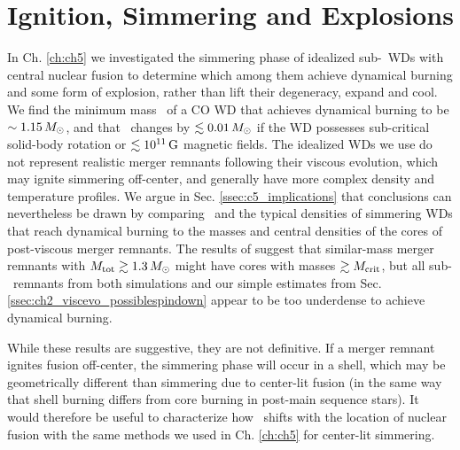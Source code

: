 
\section{Ignition, Simmering and Explosions}


In Ch. \ref{ch:ch5} we investigated the simmering phase of idealized sub-\Mch\ WDs with central nuclear fusion to determine which among them achieve dynamical burning and some form of explosion, rather than lift their degeneracy, expand and cool.  We find the minimum mass \Mcrit\ of a CO WD that achieves dynamical burning to be $\sim1.15\,\Msun$, and that \Mcrit\ changes by $\lesssim0.01\,\Msun$ if the WD possesses sub-critical solid-body rotation or $\lesssim 10^{11}\,\mathrm{G}$ magnetic fields.  The idealized WDs we use do not represent realistic merger remnants following their viscous evolution, which may ignite simmering off-center, and generally have more complex density and temperature profiles.  We argue in Sec. \ref{ssec:c5_implications} that conclusions can nevertheless be drawn by comparing \Mcrit\ and the typical densities of simmering WDs that reach dynamical burning to the masses and central densities of the cores of post-viscous merger remnants.  The results of \cite{ji+13} suggest that similar-mass merger remnants with $\Mtot \gtrsim 1.3\,\Msun$ might have cores with masses $\gtrsim\Mcrit$, but all sub-\Mch\ remnants from both simulations and our simple estimates from Sec. \ref{ssec:ch2_viscevo_possiblespindown} appear to be too underdense to achieve dynamical burning.  

While these results are suggestive, they are not definitive.  If a merger remnant ignites fusion off-center, the simmering phase will occur in a shell, which may be geometrically different than simmering due to center-lit fusion (in the same way that shell burning differs from core burning in post-main sequence stars).  It would therefore be useful to characterize how \Mcrit\ shifts with the location of nuclear fusion with the same methods we used in Ch. \ref{ch:ch5} for center-lit simmering.

